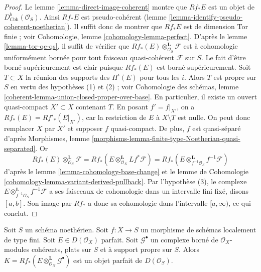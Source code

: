 \begin{proof}
Le lemme \ref{lemma-direct-image-coherent} montre que $Rf_*E$ est un objet de
$D^b_{\textit{Coh}}(\mathcal{O}_S)$. Ainsi $Rf_*E$ est pseudo-cohérent
(lemme \ref{lemma-identify-pseudo-coherent-noetherian}).
Il suffit donc de montrer que $Rf_*E$ est de dimension Tor finie ; voir
Cohomologie, lemme \ref{cohomology-lemma-perfect}.
D'après le lemme \ref{lemma-tor-qc-qs}, il suffit de vérifier que
$Rf_*(E) \otimes_{\mathcal{O}_S}^\mathbf{L} \mathcal{F}$
est à cohomologie uniformément bornée pour tout faisceau quasi-cohérent
$\mathcal{F}$ sur $S$. Le fait d'être borné supérieurement est clair puisque $Rf_*(E)$
est borné supérieurement. Soit $T \subset X$ la réunion des supports
des $H^i(E)$ pour tous les $i$. Alors $T$ est propre sur $S$ en vertu des hypothèses
(1) et (2) ; voir Cohomologie des schémas, lemme
\ref{coherent-lemma-union-closed-proper-over-base}.
En particulier, il existe un ouvert quasi-compact
$X' \subset X$ contenant $T$. En posant $f' = f|_{X'}$, on a
$Rf_*(E) = Rf'_*(E|_{X'})$, car la restriction de $E$ à $X \setminus T$ est nulle.
On peut donc remplacer $X$ par $X'$ et supposer $f$ quasi-compact.
De plus, $f$ est quasi-séparé d'après Morphismes, lemme
\ref{morphisms-lemma-finite-type-Noetherian-quasi-separated}. Or
$$
Rf_*(E) \otimes_{\mathcal{O}_S}^\mathbf{L} \mathcal{F} =
Rf_*\left(E \otimes_{\mathcal{O}_X}^\mathbf{L} Lf^*\mathcal{F}\right) =
Rf_*\left(E \otimes_{f^{-1}\mathcal{O}_S}^\mathbf{L} f^{-1}\mathcal{F}\right)
$$
d'après
le lemme \ref{lemma-cohomology-base-change}
et le
lemme de Cohomologie \ref{cohomology-lemma-variant-derived-pullback}.
Par l'hypothèse (3), le complexe
$E \otimes_{f^{-1}\mathcal{O}_S}^\mathbf{L} f^{-1}\mathcal{F}$
a ses faisceaux de cohomologie dans un
intervalle fini fixé, disons $[a, b]$. Son image par $Rf_*$
a donc sa cohomologie dans l'intervalle $[a, \infty)$, ce qui conclut.
\end{proof}

\begin{lemma}
\label{lemma-tensor-perfect}
Soit $S$ un schéma noethérien. Soit $f : X \to S$ un morphisme de schémas
localement de type fini. Soit $E \in D(\mathcal{O}_X)$ parfait.
Soit $\mathcal{G}^\bullet$ un complexe borné de
$\mathcal{O}_X$-modules cohérents, plats sur $S$ et à support propre sur $S$.
Alors $K = Rf_*(E \otimes_{\mathcal{O}_X}^\mathbf{L} \mathcal{G}^\bullet)$
est un objet parfait de $D(\mathcal{O}_S)$.
\end{lemma}

